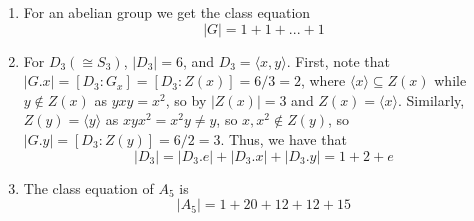 \documentclass[12pt, a4paper, twoside, openright, titlepage]{book}
\begin{document}
\begin{eg}{}{}
        \leavevmode
        \begin{enumerate}
                \item For an abelian group we get the class equation \begin{equation}
                                |G| = 1+1+...+1
                \end{equation}
                \item For $D_3 (\cong S_3)$, $|D_3| = 6$, and $D_3 = \langle x,y\rangle$. First, note that $|G.x| = [D_3:G_x] = [D_3:Z(x)] = 6/3 = 2$, where $\langle x \rangle \subseteq Z(x)$ while $y \notin Z(x)$ as $yxy = x^2$, so by  $|Z(x)| = 3$ and $Z(x) = \langle x \rangle$. Similarly, $Z(y) = \langle y \rangle$ as $xyx^2 = x^2y \neq y$, so $x,x^2 \notin Z(y)$, so $|G.y| = [D_3:Z(y)] = 6/2 = 3$. Thus, we have that \begin{equation}
                                |D_3| = |D_3.e| + |D_3.x| + |D_3.y| = 1 + 2 + e
                \end{equation}
        \item The class equation of $A_5$ is \begin{equation}
                        |A_5| = 1+ 20 + 12 + 12 + 15
        \end{equation}

\end{enumerate}
\end{eg}
\end{document}
